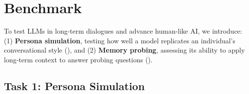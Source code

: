 \section{\dataset{} Benchmark}  
To test LLMs in long-term dialogues and advance human-like AI, we introduce: 
(1) \textbf{Persona simulation}, testing how well a model replicates an individual’s conversational style (), and  
(2) \textbf{Memory probing}, assessing its ability to apply long-term context to answer probing questions ().

\subsection{Task 1: Persona Simulation}
\label{ssec:persona-simulation}

\begin{table*}[!t]
    \centering
    \vspace{-0.2cm}
    \caption{\textbf{Average content similarity and message-level EI comparison in persona simulation} for all speakers, with and without fine-tuning. Full results are available in Appendix~\ref{appendix:persona-simulation}. Content similarity differences are not statistically significant, while message-level EI differences are significant (\( p < 0.02 \) for all attributes).}
    \label{tab:persona-simulation}
    \vspace{-0.3cm}
\end{table*}


